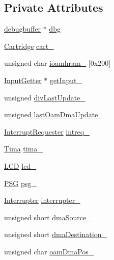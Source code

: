 \subsection*{Private Attributes}
\begin{DoxyCompactItemize}
\item 
\hyperlink{structgambatte_1_1debugbuffer}{debugbuffer} $\ast$ \hyperlink{classgambatte_1_1Memory_a0a440f9380d0e6e98907c12916dc05bf}{dbg}
\item 
\hyperlink{classgambatte_1_1Cartridge}{Cartridge} \hyperlink{classgambatte_1_1Memory_a1092cc47a23dcb90567b09a300ef5d4a}{cart\+\_\+}
\item 
unsigned char \hyperlink{classgambatte_1_1Memory_ad48ae29231bc90d6915f002f50af4143}{ioamhram\+\_\+} \mbox{[}0x200\mbox{]}
\item 
\hyperlink{classgambatte_1_1InputGetter}{Input\+Getter} $\ast$ \hyperlink{classgambatte_1_1Memory_afa9ea768075a18a232273e4c73594102}{get\+Input\+\_\+}
\item 
unsigned \hyperlink{classgambatte_1_1Memory_a8b4cc795266d0028c201ead4d88c040d}{div\+Last\+Update\+\_\+}
\item 
unsigned \hyperlink{classgambatte_1_1Memory_ac4ea173e2db12cb38d32bf936c2b5d91}{last\+Oam\+Dma\+Update\+\_\+}
\item 
\hyperlink{classgambatte_1_1InterruptRequester}{Interrupt\+Requester} \hyperlink{classgambatte_1_1Memory_afab4e100281670f12c722d7d2afd42b7}{intreq\+\_\+}
\item 
\hyperlink{classgambatte_1_1Tima}{Tima} \hyperlink{classgambatte_1_1Memory_a3f7fca941814c3450def24d3dd5720f3}{tima\+\_\+}
\item 
\hyperlink{classgambatte_1_1LCD}{L\+CD} \hyperlink{classgambatte_1_1Memory_ac33d3627e5ffbd7e781b8f6e9093633f}{lcd\+\_\+}
\item 
\hyperlink{classgambatte_1_1PSG}{P\+SG} \hyperlink{classgambatte_1_1Memory_a236658c7d4161cba1ded4b0d9b5a4606}{psg\+\_\+}
\item 
\hyperlink{classgambatte_1_1Interrupter}{Interrupter} \hyperlink{classgambatte_1_1Memory_a3750544bcc0c786925fc1de3b0a4b503}{interrupter\+\_\+}
\item 
unsigned short \hyperlink{classgambatte_1_1Memory_ac6ab047ceaf5b80da7cd78797ed984c2}{dma\+Source\+\_\+}
\item 
unsigned short \hyperlink{classgambatte_1_1Memory_a4e1673e5e9d81eca50db43bacc69094e}{dma\+Destination\+\_\+}
\item 
unsigned char \hyperlink{classgambatte_1_1Memory_a954f692f5ae3d0002e377d059a206403}{oam\+Dma\+Pos\+\_\+}

\end{DoxyCompactItemize}
